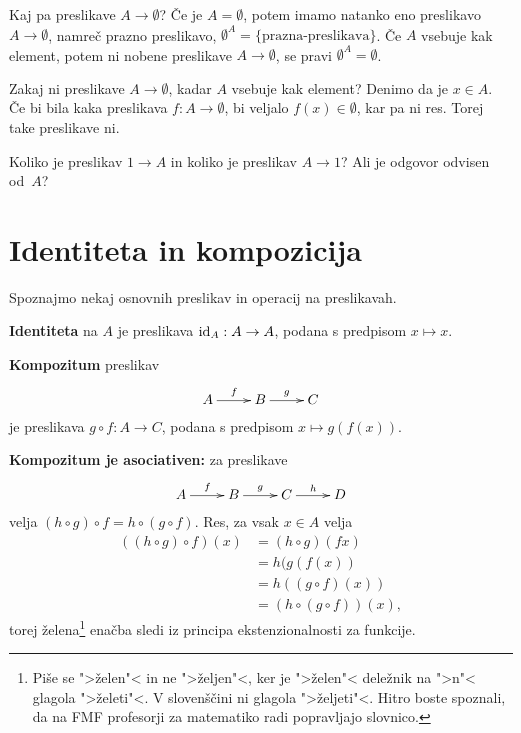 Kaj pa preslikave $A \to \emptyset$?
%
Če je $A = \emptyset$, potem imamo natanko eno preslikavo $A \to \emptyset$, namreč prazno preslikavo, $\emptyset^A = \{ \textrm{prazna-preslikava} \}$.
%
Če $A$ vsebuje kak element, potem ni nobene preslikave $A \to \emptyset$, se pravi  $\emptyset^A = \emptyset$.

Zakaj ni preslikave $A \to \emptyset$, kadar $A$ vsebuje kak element? Denimo da je $x \in A$. Če bi bila kaka preslikava $f : A \to \emptyset$, bi
veljalo $f(x) \in \emptyset$, kar pa ni res. Torej take preslikave ni.

\begin{naloga}
  Koliko je preslikav $1 \to A$ in koliko je preslikav $A \to 1$?
  Ali je odgovor odvisen od~$A$?
\end{naloga}

\section{Identiteta in kompozicija}

Spoznajmo nekaj osnovnih preslikav in operacij na preslikavah.

\textbf{Identiteta} na $A$ je preslikava $\id[A] : A \to A$, podana s predpisom $x \mapsto x$.

\textbf{Kompozitum} preslikav
%
\begin{equation*}
  \xymatrix{
    {A} \ar[r]^f & {B} \ar[r]^g & {C}
  }
\end{equation*}
%
je preslikava $g \circ f : A \to C$, podana s predpisom $x \mapsto g(f(x))$.

\textbf{Kompozitum je asociativen:} za preslikave
%
\begin{equation*}
  \xymatrix{
    {A} \ar[r]^f & {B} \ar[r]^g & {C} \ar[r]^h & {D}
  }
\end{equation*}
%
velja $(h \circ g) \circ f = h \circ (g \circ f)$. Res, za vsak $x \in A$ velja
%
\begin{align*}
  ((h \circ g) \circ f)(x)
  &= (h \circ g) (f x) \\
  &=  h (g (f (x)) \\
  &= h ((g \circ f)(x)) \\
  &= (h \circ (g \circ f))(x),
\end{align*}
%
torej želena\footnote{Piše se ">želen"< in ne ">željen"<, ker je ">želen"< deležnik na
  ">n"< glagola ">želeti"<. V slovenščini ni glagola ">željeti"<. Hitro boste spoznali, da na FMF profesorji za matematiko radi popravljajo slovnico.} enačba sledi iz principa ekstenzionalnosti za funkcije.

